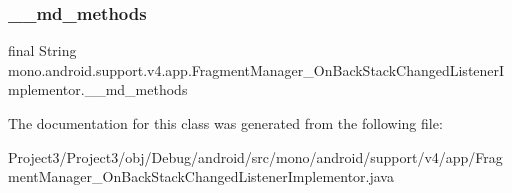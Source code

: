 \subsubsection{\texorpdfstring{\+\_\+\+\_\+md\+\_\+methods}{\_\_md\_methods}}
{\footnotesize\ttfamily final String mono.\+android.\+support.\+v4.\+app.\+Fragment\+Manager\+\_\+\+On\+Back\+Stack\+Changed\+Listener\+Implementor.\+\_\+\+\_\+md\+\_\+methods\hspace{0.3cm}{\ttfamily [static]}}



The documentation for this class was generated from the following file\+:\begin{DoxyCompactItemize}
\item 
Project3/\+Project3/obj/\+Debug/android/src/mono/android/support/v4/app/Fragment\+Manager\+\_\+\+On\+Back\+Stack\+Changed\+Listener\+Implementor.\+java\end{DoxyCompactItemize}
